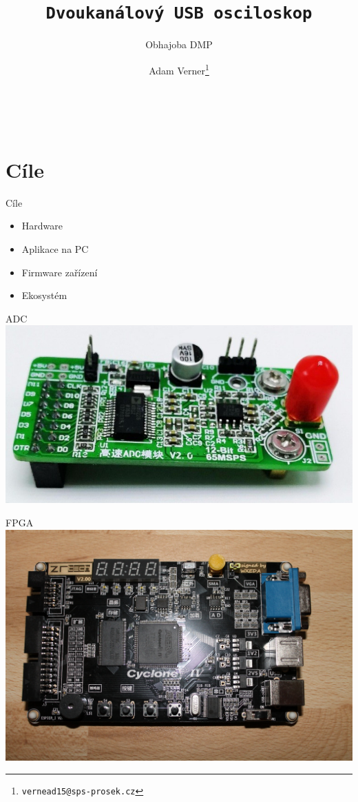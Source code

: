 \documentclass{beamer}
\title{\texttt{\LARGE Dvoukanálový USB osciloskop}}
\subtitle{ Obhajoba DMP }
\author{ Adam Verner\footnote{\texttt{vernead15@sps-prosek.cz}}}
\begin{document}
\begin{frame}
	\maketitle \\
\end{frame}
	
\section{Cíle}

	\begin{frame}{Cíle}
		\begin{itemize}

			\item Hardware			\pause
			\item Aplikace na PC	\pause
			\item Firmware zařízení \pause
			\item Ekosystém
		
		\end{itemize}
	\end{frame}		
	
	
	
	\begin{frame}{ADC}
		\includegraphics[width=\paperwidth]{adc_board.jpg}
	\end{frame}

	\begin{frame}{FPGA}
		\includegraphics[width=\paperwidth]{ZRtech_board.jpg}
	\end{frame}
\end{document}
